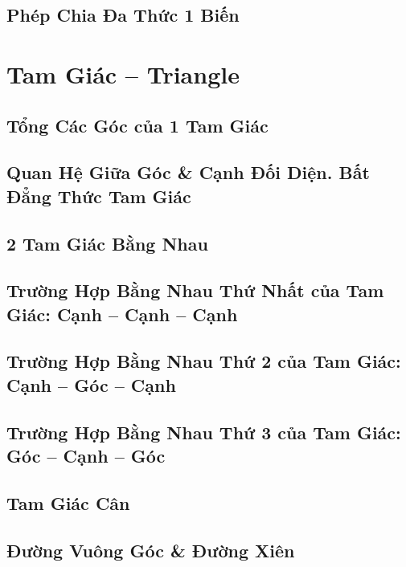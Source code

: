 \documentclass[oneside]{book}
\numberwithin{equation}{section}
\begin{document}
\section{Phép Chia Đa Thức 1 Biến}


\chapter{Tam Giác -- Triangle}

\section{Tổng Các Góc của 1 Tam Giác}

\section{Quan Hệ Giữa Góc \& Cạnh Đối Diện. Bất Đẳng Thức Tam Giác}

\section{2 Tam Giác Bằng Nhau}

\section{Trường Hợp Bằng Nhau Thứ Nhất của Tam Giác: Cạnh -- Cạnh -- Cạnh}

\section{Trường Hợp Bằng Nhau Thứ 2 của Tam Giác: Cạnh -- Góc -- Cạnh}

\section{Trường Hợp Bằng Nhau Thứ 3 của Tam Giác: Góc -- Cạnh -- Góc}

\section{Tam Giác Cân}

\section{Đường Vuông Góc \& Đường Xiên}
\end{document}
